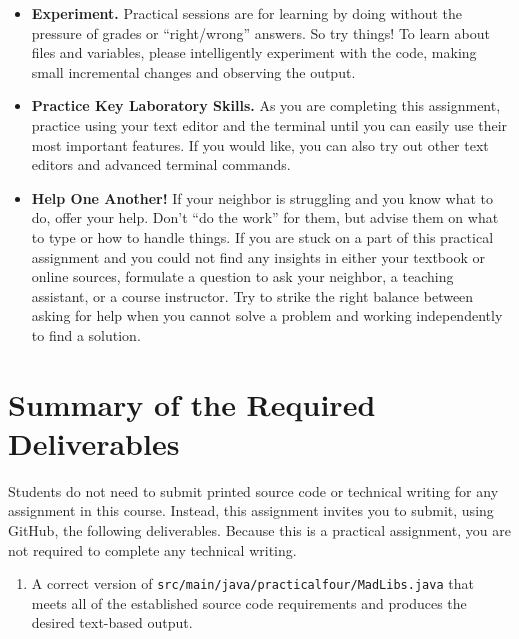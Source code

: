 \documentclass[11pt]{article}
\newcommand{\mainprogramsource}{\lstinline{src/main/java/practicalfour/MadLibs.java}}
\begin{document}
\vspace*{-.05in}
\begin{itemize}

\itemsep 0in

\item {\bf Experiment.} Practical sessions are for learning by doing without the
  pressure of grades or ``right/wrong'' answers. So try things! To learn about
  files and variables, please intelligently experiment with the code, making
  small incremental changes and observing the output.

\item {\bf Practice Key Laboratory Skills.} As you are completing this
  assignment, practice using your text editor and the terminal until you can
  easily use their most important features. If you would like, you can also try
  out other text editors and advanced terminal commands.

\item {\bf Help One Another!} If your neighbor is struggling and you know what
  to do, offer your help. Don't ``do the work'' for them, but advise them on
  what to type or how to handle things. If you are stuck on a part of this
  practical assignment and you could not find any insights in either your
  textbook or online sources, formulate a question to ask your neighbor, a
  teaching assistant, or a course instructor. Try to strike the right balance
  between asking for help when you cannot solve a problem and working
  independently to find a solution.

\end{itemize}

\section*{Summary of the Required Deliverables}

\noindent Students do not need to submit printed source code or technical
writing for any assignment in this course. Instead, this assignment invites you
to submit, using GitHub, the following deliverables. Because this is a practical
assignment, you are not required to complete any technical writing.

\begin{enumerate}

\setlength{\itemsep}{0in}

\item A correct version of \mainprogramsource{} that meets all of the
  established source code requirements and produces the desired text-based
  output.

\end{enumerate}
\end{document}
